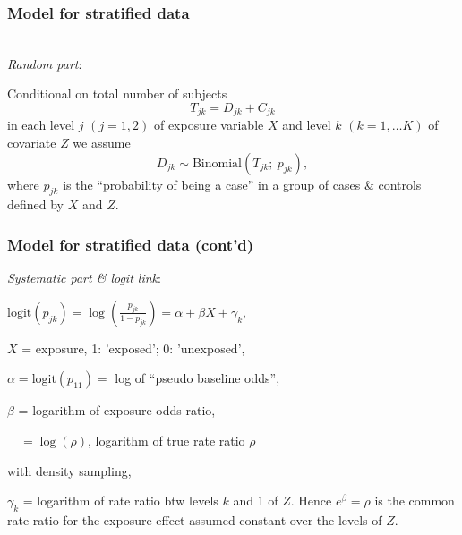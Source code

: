\documentclass[handout,12pt]{beamer}
\begin{document}


\begin{frame} \frametitle{Model for stratified data}
\ \\
{\it Random part}: 

Conditional on total number of subjects 
$$T_{jk} = D_{jk} + C_{jk}$$ 
in each level $j$ $(j=1, 2)$ of
exposure variable $X$ 
and level $k$ $(k=1,\dots K)$ of
covariate $Z$ we assume 
$$ D_{jk} \sim  \mbox{Binomial}(T_{jk};\ p_{jk}) , $$
where $p_{jk}$ is the ``probability of being a case''
in a group of cases \& controls defined by $X$ and $Z$.

\end{frame} 

\begin{frame} \frametitle{Model for stratified data (cont'd)}

\medskip
{\it Systematic part \& logit link}:
\begin{center} 
$ \text{logit}( p_{jk} )
 = \log \left( \frac{\displaystyle p_{jk}}
  { \displaystyle 1 - p_{jk} } 
   \right ) = \alpha + \beta X + \gamma_k , $
\end{center}   
\bi
\item[ ]$X$ = exposure, 1: 'exposed'; 0: 'unexposed',
\item[ ]$\alpha = \text{logit}(p_{11}) = $  
                  log of ``pseudo baseline odds'',
\item[ ]$\beta$ = logarithm of exposure odds ratio,  
\item[ ]$\quad  =    \log(\rho)$, 
     logarithm of true rate ratio $\rho$
\item[ ] \quad\quad with density sampling,
\item[ ]$\gamma_k$ = logarithm of 
   rate ratio btw levels $k$ and  1  of  $Z$.
\ei
Hence $e^{\beta} = \rho$ is the common rate ratio 
for the exposure effect assumed constant over the levels of $Z$. 
\end{frame} 
\end{document}
